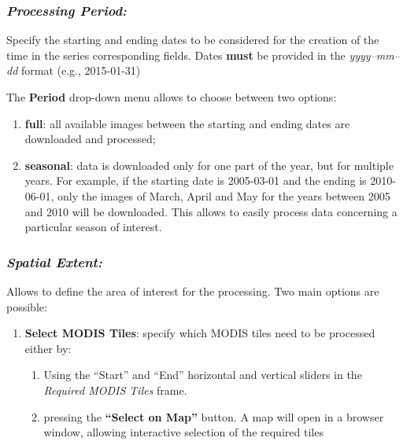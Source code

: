 \documentclass[]{article}
\providecommand{\tightlist}{%
  \setlength{\itemsep}{0pt}\setlength{\parskip}{0pt}}
\begin{document}
\subsubsection{\texorpdfstring{\textbf{\emph{Processing
Period:}}}{Processing Period:}}\label{processing-period}

Specify the starting and ending dates to be considered for the creation
of the time in the series corresponding fields. Dates \textbf{must} be
provided in the \emph{yyyy--mm--dd} format (e.g., 2015-01-31)

The \textbf{Period} drop-down menu allows to choose between two options:

\begin{enumerate}
\def\labelenumi{\arabic{enumi}.}
\item
  \textbf{full}: all available images between the starting and ending
  dates are downloaded and processed;
\item
  \textbf{seasonal}: data is downloaded only for one part of the year,
  but for multiple years. For example, if the starting date is
  2005-03-01 and the ending is 2010-06-01, only the images of March,
  April and May for the years between 2005 and 2010 will be downloaded.
  This allows to easily process data concerning a particular season of
  interest.
\end{enumerate}

\subsubsection{\texorpdfstring{\textbf{\emph{Spatial
Extent:}}}{Spatial Extent:}}\label{spatial-extent}

Allows to define the area of interest for the processing. Two main
options are possible:

\begin{enumerate}
\def\labelenumi{\arabic{enumi}.}
\item
  \textbf{Select MODIS Tiles}: specify which MODIS tiles need to be
  processed either by:

  \begin{enumerate}
  \def\labelenumii{\alph{enumii}.}
  \tightlist
  \item
    Using the ``Start'' and ``End'' horizontal and vertical sliders in
    the \emph{Required MODIS Tiles} frame.\\
  \item
    pressing the \textbf{``Select on Map''} button. A map will open in a
    browser window, allowing interactive selection of the required tiles
  \end{enumerate}
\end{enumerate}
\end{document}

